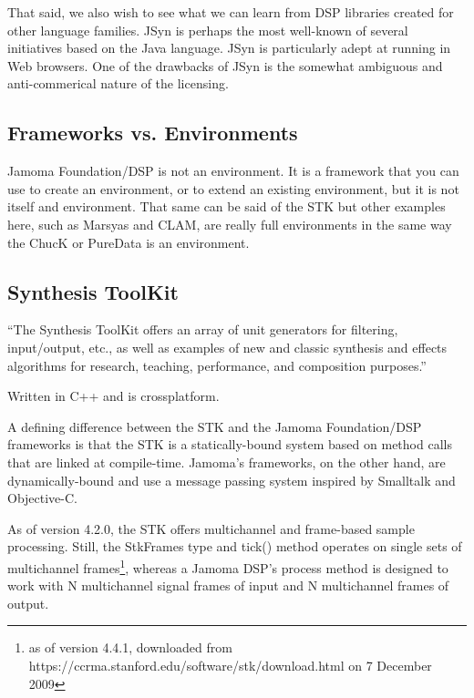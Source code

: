 \documentclass[twoside,10pt]{article}
\begin{document}
That said, we also wish to see what we can learn from DSP libraries created for other language families.  JSyn is perhaps the most well-known of several initiatives based on the Java language\cite{Guillemard:2005, Burk:1998}.  JSyn is particularly adept at running in Web browsers.  One of the drawbacks of JSyn is the somewhat ambiguous and anti-commerical nature of the licensing.


\subsection {Frameworks vs. Environments}


Jamoma Foundation/DSP is not an environment.  It is a framework that you can use to create an environment, or to extend an existing environment, but it is not itself and environment.  That same can be said of the STK but other examples here, such as Marsyas and CLAM, are really full environments in the same way the ChucK or PureData is an environment.


\subsection{Synthesis ToolKit} %

``The Synthesis ToolKit offers an array of unit generators for filtering, input/output, etc., as well as examples of new and classic synthesis and effects algorithms for research, teaching, performance, and composition purposes.''\cite{Cook:1999}

Written in C++ and is crossplatform.


A defining difference between the STK and the Jamoma Foundation/DSP frameworks is that the STK is a statically-bound system based on method calls that are linked at compile-time.  Jamoma's frameworks, on the other hand, are dynamically-bound and use a message passing system inspired by Smalltalk\cite{Krasner:1988} and Objective-C\cite{Cox:1986}.

As of version 4.2.0, the STK offers multichannel and frame-based sample processing\cite{Scavone:2005}. Still, the StkFrames type and tick() method operates on single sets of multichannel frames\footnote{as of version 4.4.1, downloaded from https://ccrma.stanford.edu/software/stk/download.html on 7 December 2009}, whereas a Jamoma DSP's process method is designed to work with N multichannel signal frames of input and N multichannel frames of output.
\end{document}
